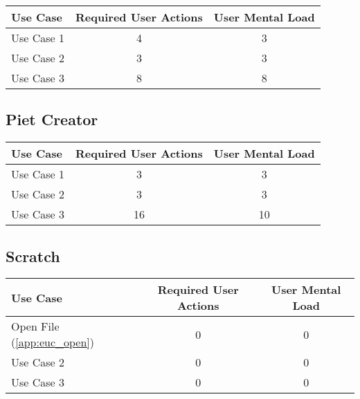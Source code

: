 \begin{tabularx}{\textwidth}{Xcc}
\textbf{Use Case} & \textbf{Required User Actions} & \textbf{User Mental Load}\\
\hline
Use Case 1                          & 4 & 3 \\
Use Case 2                          & 3 & 3 \\
Use Case 3                          & 8 & 8
\end{tabularx}

\subsection*{Piet Creator}




\begin{tabularx}{\textwidth}{Xcc}
\textbf{Use Case} & \textbf{Required User Actions} & \textbf{User Mental Load}\\
\hline
Use Case 1                          & 3 & 3 \\
Use Case 2                          & 3 & 3 \\
Use Case 3                          & 16 & 10
\end{tabularx}

\subsection*{Scratch}

\begin{tabularx}{\textwidth}{Xcc}
\textbf{Use Case} & \textbf{Required User Actions} & \textbf{User Mental Load}\\
\hline
Open File (\ref{app:euc_open}) & {\color{red}0} & {\color{red}0} \\
Use Case 2                     & {\color{red}0} & {\color{red}0} \\
Use Case 3                     & {\color{red}0} & {\color{red}0}
\end{tabularx}

